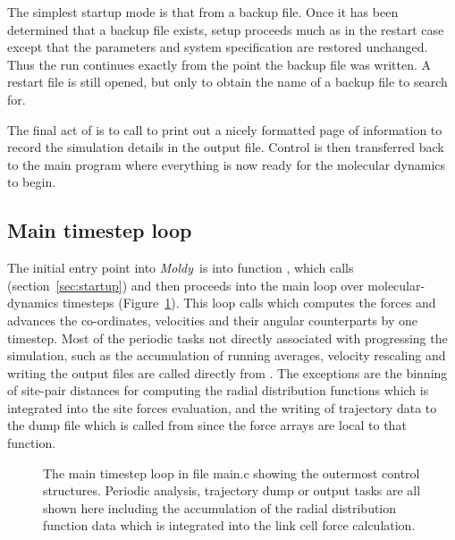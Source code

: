 \documentclass[a4paper,twoside]{report}
\newcommand{\Fname}[1]{{\upshape\mdseries\sffamily#1}}
\newcommand{\moldy}{\emph{Moldy}}
\begin{document}
The simplest startup mode is that from a backup file.  Once it has
been determined that a backup file exists, setup proceeds much as in
the restart case except that the parameters and system specification
are restored unchanged.  Thus the run continues exactly from the
point the backup file was written. A restart file is still opened, but
only to obtain the name of a backup file to search for.

The final act of  is to call 
to print out a nicely formatted page of information to record the
simulation details in the output file.  Control is then transferred
back to the main program where everything is now ready for the
molecular dynamics to begin.


\subsection{Main timestep loop}

The initial entry point into \moldy\ is into function ,
which calls  (section~\ref{sec:startup}) and then
proceeds into the main loop over molecular-dynamics timesteps
(Figure~\ref{fig:main}).  This loop calls  which
computes the forces and advances the co-ordinates, velocities and
their angular counterparts by one timestep.  Most of the periodic
tasks not directly associated with progressing the simulation, such as
the accumulation of running averages, velocity rescaling and writing
the output files are called directly from .
The exceptions are the binning of site-pair distances for computing
the radial distribution functions which is integrated into the site
forces evaluation, and the writing of trajectory data to the dump file
which is called from  since the force arrays are
local to that function.

\begin{figure}[tb]

\caption[The main timestep loop]{The main timestep loop in file
\Fname{main.c} showing the outermost control structures.  Periodic
analysis, trajectory dump or output tasks are all shown here including
the accumulation of the radial distribution function data which is
integrated into the link cell force calculation.}
\label{fig:main}
\end{figure}
\end{document}
